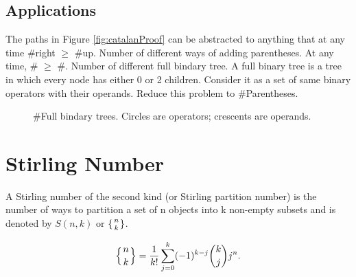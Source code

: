 \subsection{Applications}
The paths in Figure \ref{fig:catalanProof} can be abstracted to anything that at any time \#right $\geq$ \#up. 
Number of different ways of adding parentheses. At any time, \#\pyinline{(} $\geq$ \#\pyinline{)}.
Number of different full bindary tree. A full binary tree is a tree in which every node has either 0 or 2 children. Consider it as a set of same binary operators with their operands. Reduce this problem to \#Parentheses. 
\begin{figure}[hbtp]
\centering
{}
\caption{\#Full bindary trees. Circles are operators; crescents are operands.}
\label{fig:NumberOfBSTs}
\end{figure}

\section{Stirling Number}
A Stirling number of the second kind (or Stirling partition number) is the number of ways to partition a set of n objects into k non-empty subsets and is denoted by $S(n,k)$ or  $\lbrace{n\atop k}\rbrace$.

$$
\left\{ {n \atop k}\right\} = \frac{1}{k!}\sum_{j=0}^{k} (-1)^{k-j} \binom{k}{j} j^n.
$$
